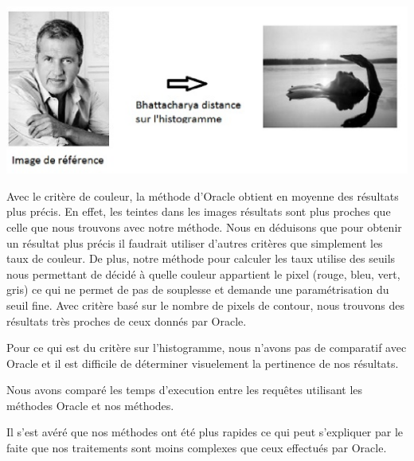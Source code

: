 \begin{center}
\includegraphics[scale=0.55]{resultatHist.eps}
\hspace{5pt}
\end{center}

Avec le critère de couleur, la méthode d'Oracle obtient en moyenne des résultats plus précis. En effet, les teintes dans les images résultats sont plus proches que celle que nous trouvons avec notre méthode. Nous en déduisons que pour obtenir un résultat plus précis il faudrait utiliser d'autres critères que simplement les taux de couleur. De plus, notre méthode pour calculer les taux utilise des seuils nous permettant de décidé à quelle couleur appartient le pixel (rouge, bleu, vert, gris) ce qui ne permet de pas de souplesse et demande une paramétrisation du seuil fine.
Avec critère basé sur le nombre de pixels de contour, nous trouvons des résultats très proches de ceux donnés par Oracle.

Pour ce qui est du critère sur l'histogramme, nous n'avons pas de comparatif avec Oracle et il est difficile de déterminer visuelement la pertinence de nos résultats.


Nous avons comparé les temps d'execution entre les requêtes utilisant les méthodes Oracle et nos méthodes.

\begin{table}[ht]
\centering
{}
\caption{Tableau de comparaison des temps d'execution} 
\end{table} 

Il s'est avéré que nos méthodes ont été plus rapides ce qui peut s'expliquer par le faite que nos traitements sont moins complexes que ceux effectués par Oracle.
